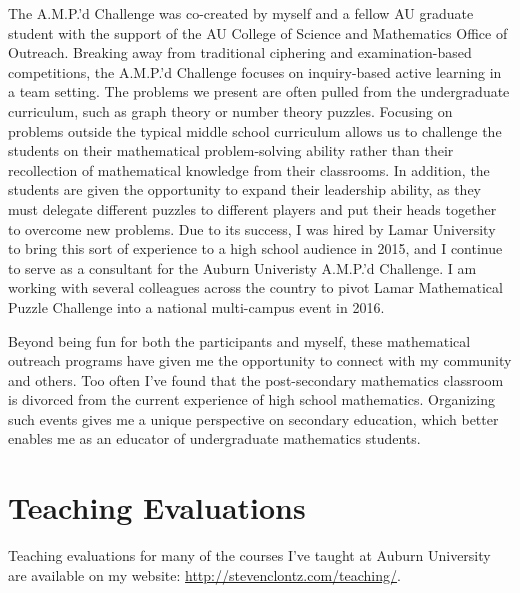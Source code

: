 \documentclass[11pt]{amsart}
\theoremstyle{plain}
\newcommand{\<}{\langle}
\renewcommand{\>}{\rangle}
\begin{document}
The A.M.P.'d Challenge was co-created by myself and a fellow AU graduate
student with the support of the AU College of Science and Mathematics Office
of Outreach. Breaking away from traditional ciphering and examination-based
competitions, the A.M.P.'d Challenge focuses on inquiry-based active learning
in a team setting. The problems we present are often pulled from the
undergraduate curriculum, such as graph theory or number theory puzzles.
Focusing on problems outside the typical middle school curriculum allows us
to challenge the students on their mathematical problem-solving ability rather
than their recollection of mathematical knowledge from their classrooms.
In addition, the students are given the opportunity to expand their leadership
ability, as they must delegate different puzzles to different players and
put their heads together to overcome new problems. Due to its success,
I was hired by Lamar University to bring this sort of experience to a high
school audience in 2015, and I continue to serve as a consultant for the
Auburn Univeristy A.M.P.'d Challenge. I am working with several colleagues
across the country to pivot Lamar Mathematical Puzzle Challenge into
a national multi-campus event in 2016.

Beyond being fun for both the participants and myself, these mathematical
outreach programs have given me the opportunity to connect with my
community and others. Too often I've found that the post-secondary mathematics
classroom is divorced from the current experience of high school mathematics.
Organizing such events gives me a unique
perspective on secondary education, which better enables me as an educator of
undergraduate mathematics students.


\section*{Teaching Evaluations}

Teaching evaluations for many of the courses I've taught at Auburn University
are available on my website: \url{http://stevenclontz.com/teaching/}.

\vfill
\end{document}
